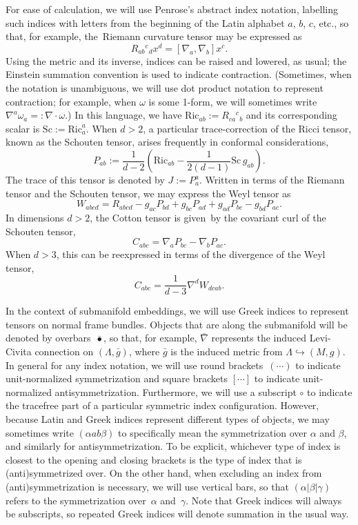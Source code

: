 \documentclass[pdftex]{sigma}
\numberwithin{equation}{section}
\renewcommand{\=}{\stackrel \Lambda =}
\begin{document}
For ease of calculation, we will use Penrose's abstract index notation, labelling such indices with letters from the beginning of the Latin alphabet $a$, $b$, $c$, etc., so that, for example, the~Riemann curvature tensor may be expressed as
\[
R_{ab}{}^c{}_d x^d = [\nabla_a, \nabla_b] x^c .
\]
Using the metric and its inverse, indices can be raised and lowered, as usual; the Einstein summation convention is used to indicate contraction. (Sometimes, when the notation is unambiguous, we will use dot product notation to represent contraction; for example, when $\omega$ is some 1-form, we will sometimes write $\nabla^a \omega_a =: \nabla \cdot \omega$.) In this language, we have $\mathrm{Ric}_{ab} := R_{ca}{}^c{}_b$ and its corresponding scalar is $\mathrm{Sc} := \mathrm{Ric}_a^a$. When $d > 2$, a particular trace-correction of the Ricci tensor, known as the Schouten tensor, arises frequently in conformal considerations,
\[
P_{ab} := \frac{1}{d-2} \left(\mathrm{Ric}_{ab} - \frac{1}{2(d-1)} \mathrm{Sc}\, g_{ab} \right) .
\]
The trace of this tensor is denoted by $J := P_a^a$. Written in terms of the Riemann tensor and the Schouten tensor, we may express the Weyl tensor as
\[
W_{abcd} = R_{abcd} - g_{ac} P_{bd} + g_{bc} P_{ad} + g_{ad} P_{bc} - g_{bd} P_{ac} .
\]
In dimensions $d > 2$, the Cotton tensor is given~by the covariant curl of the Schouten tensor,
\[
C_{abc} = \nabla_a P_{bc} - \nabla_b P_{ac} .
\]
When $d > 3$, this can be reexpressed in terms of the divergence of the Weyl tensor,
\[
C_{abc} = \frac{1}{d-3} \nabla^d W_{dcab} .
\]

In the context of submanifold embeddings, we will use Greek indices to represent tensors on normal frame bundles. Objects that are along the submanifold will be denoted by overbars~$\bar{\bullet}$, so that, for example, $\bar{\nabla}$ represents the induced Levi-Civita connection on $(\Lambda,\bar{g})$, where $\bar{g}$ is the induced metric from $\Lambda \hookrightarrow (M,g)$. In general for any index notation, we will use round brackets~$(\cdots)$ to indicate unit-normalized symmetrization and square brackets $[\cdots]$ to indicate unit-normalized antisymmetrization. Furthermore, we will use a subscript $\circ$ to indicate the tracefree part of a particular symmetric index configuration. However, because Latin and Greek indices represent different types of objects, we may sometimes write $(\alpha a b \beta)$ to specifically mean the symmetrization over $\alpha$ and $\beta$, and similarly for antisymmetrization. To be explicit, whichever type of index is closest to the opening and closing brackets is the type of index that is (anti)symmetrized over. On the other hand, when excluding an index from (anti)symmetrization is necessary, we will use vertical bars, so that $(\alpha | \beta | \gamma)$ refers to the symmetrization over~$\alpha$ and~$\gamma$. Note that Greek indices will always be subscripts, so repeated Greek indices will denote summation in the usual way.
\end{document}
